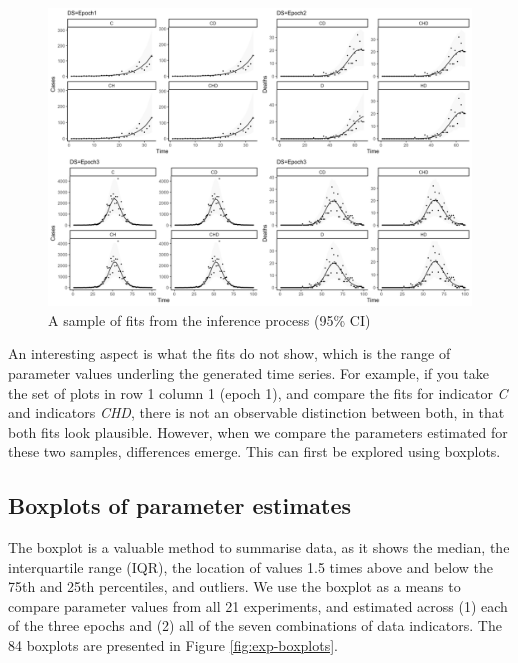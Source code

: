 \documentclass[10pt,letterpaper]{article}
\begin{document}
\begin{figure}
\includegraphics[width=1\linewidth]{diagrams/exp_fits} \caption{A sample of fits from the inference process (95\% CI)}\label{fig:exp-fits}
\end{figure}

An interesting aspect is what the fits do not show, which is the range of parameter values underling the generated time series. For example, if you take the set of plots in row 1 column 1 (epoch 1), and compare the fits for indicator \emph{C} and indicators \emph{CHD}, there is not an observable distinction between both, in that both fits look plausible. However, when we compare the parameters estimated for these two samples, differences emerge. This can first be explored using boxplots.

\hypertarget{boxplots-of-parameter-estimates}{%
\subsection{Boxplots of parameter estimates}\label{boxplots-of-parameter-estimates}}

The boxplot is a valuable method to summarise data, as it shows the median, the interquartile range (IQR), the location of values 1.5 times above and below the 75th and 25th percentiles, and outliers. We use the boxplot as a means to compare parameter values from all 21 experiments, and estimated across (1) each of the three epochs and (2) all of the seven combinations of data indicators. The 84 boxplots are presented in Figure \ref{fig:exp-boxplots}.
\end{document}

